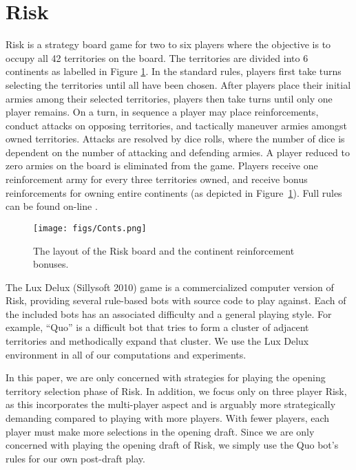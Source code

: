 \documentclass[letterpaper]{article}
\numberwithin{equation}{section}
\numberwithin{theorem}{section}
\numberwithin{lemma}{section}
\numberwithin{df}{section}
\begin{document}
\section{Risk}
\label{sec:Prob}

Risk is a strategy board game for two to six players where the objective is to occupy all 42 territories on the board.  The territories are divided into 6 continents as labelled in Figure \ref{fig:Conts}.  In the standard rules, players first take turns selecting the territories until all have been chosen.  After players place their initial armies among their selected territories, players then take turns until only one player remains.  On a turn, in sequence a player may place reinforcements, conduct attacks on opposing territories, and tactically maneuver armies amongst owned territories.  Attacks are resolved by dice rolls, where the number of dice is dependent on the number of attacking and defending armies.  A player reduced to zero armies on the board is eliminated from the game.  Players receive one reinforcement army for every three territories owned, and receive bonus reinforcements for owning entire continents (as depicted in Figure~\ref{fig:Conts}). %
Full rules can be found on-line \cite{Risk}.

\begin{figure}[t]
	\centering
	\texttt{[image: figs/Conts.png]}
	\caption{The layout of the Risk board and the continent reinforcement bonuses.}
	\label{fig:Conts}
\end{figure}

The Lux Delux (Sillysoft 2010) \nocite{Lux} %
game is a commercialized computer version of Risk, providing several rule-based bots with source code to play against.  Each of the included bots has an associated difficulty and a general playing style.  For example, ``Quo'' is a difficult bot that tries to form a cluster of adjacent territories and methodically expand that cluster.  We use the Lux Delux environment in all of our computations and experiments.  

In this paper, we are only concerned with strategies for playing the opening territory selection phase of Risk.  In addition, we focus only on three player Risk, as this incorporates the multi-player aspect and is arguably more strategically demanding compared to playing with more players.  With fewer players, each player must make more selections in the opening draft.  Since we are only concerned with playing the opening draft of Risk, we simply use the Quo bot's rules for our own post-draft play. 
\end{document}

